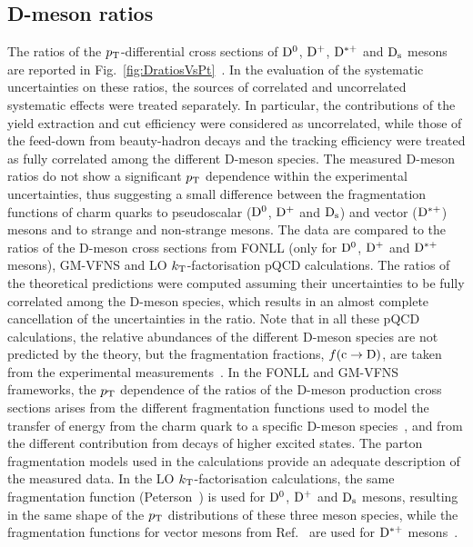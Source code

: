 \subsection{D-meson ratios}
\label{sec:ppDratios}
The ratios of the $p_{\rm T}$-differential cross sections of ${\rm D^0}$, ${\rm D^+}$, 
${\rm D^{*+}}$ and ${\rm D_s}$ mesons are reported in Fig.~\ref{fig:DratiosVsPt}~\cite{Acharya:2017jgo}.
In the evaluation of the systematic uncertainties on these ratios, 
the sources of correlated and uncorrelated systematic effects were treated 
separately. In particular, the contributions of the yield extraction and cut efficiency 
were considered as uncorrelated, while those of the feed-down from 
beauty-hadron decays and the tracking efficiency were treated as fully 
correlated among the different D-meson species.
The measured D-meson ratios do not show a significant $p_{\rm T}$ dependence within 
the experimental uncertainties, thus suggesting a small difference 
between the fragmentation functions of charm quarks to pseudoscalar 
(${\rm D^0}$, ${\rm D^+}$ and ${\rm D_s}$) and vector (${\rm D^{*+}}$) mesons and to strange and 
non-strange mesons.
The data are compared to the ratios of the D-meson cross sections from FONLL 
(only for ${\rm D^0}$, ${\rm D^+}$ and ${\rm D^{*+}}$ mesons), GM-VFNS and LO 
$k_{\rm T}$-factorisation pQCD calculations.
The ratios of the theoretical predictions were computed assuming their 
uncertainties to be fully correlated among the D-meson species, which 
results in an almost complete cancellation of the uncertainties in the ratio. 
Note that in all these pQCD calculations, the relative abundances of the 
different D-meson species are not predicted by the theory, but 
the fragmentation fractions, $f({\rm c\rightarrow D})$, are taken from 
the experimental measurements~\cite{Kneesch:2007ey,Cacciari:2012ny,Cacciari:2003zu,Maciula:2013wg,Barate:1999bg,Gladilin:2014tba}.
In the FONLL and GM-VFNS frameworks, the $p_{\rm T}$ dependence 
of the ratios of the D-meson production cross sections arises from the 
different fragmentation functions used to model the transfer of energy from 
the charm quark to a specific D-meson 
species~\cite{Cacciari:2003zu,Kneesch:2007ey,Kniehl:2006mw}, 
and from the different contribution from decays of higher excited states.
The parton fragmentation models used in the calculations provide
an adequate description of the measured data.
In the LO $k_{\rm T}$-factorisation calculations, the same fragmentation function 
(Peterson~\cite{Peterson:1982ak}) is used for ${\rm D^0}$, ${\rm D^+}$ and ${\rm D_s}$ 
mesons, resulting in the same shape of the $p_{\rm T}$ distributions of these three 
meson species, while 
the fragmentation functions for vector mesons from Ref.~\cite{Braaten:1994bz} 
are used for ${\rm D^{*+}}$ mesons~\cite{Maciula:2013wg}.

